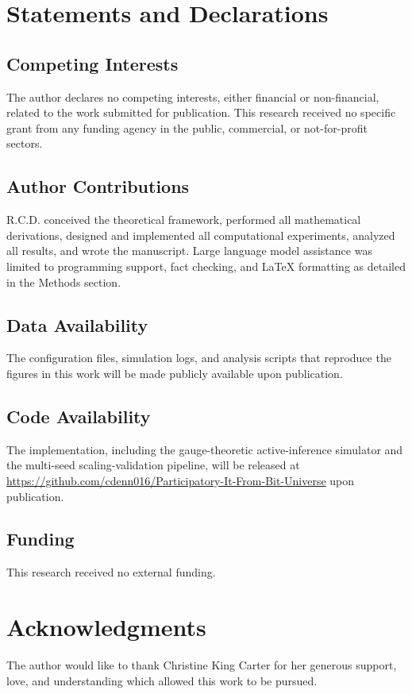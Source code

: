 \documentclass[11pt]{article}
\newenvironment{acknowledgments}
  {\section*{Acknowledgments}}
  {}
\begin{document}
\section*{Statements and Declarations}

\subsection*{Competing Interests}
The author declares no competing interests, either financial or non-financial, related to the work submitted for publication. This research received no specific grant from any funding agency in the public, commercial, or not-for-profit sectors.

\subsection*{Author Contributions}
R.C.D. conceived the theoretical framework, performed all mathematical derivations, designed and implemented all computational experiments, analyzed all results, and wrote the manuscript. Large language model assistance was limited to programming support, fact checking, and LaTeX formatting as detailed in the Methods section.

\subsection*{Data Availability}
The configuration files, simulation logs, and analysis scripts that reproduce the figures in this work will be made publicly available upon publication.

\subsection*{Code Availability}
The implementation, including the gauge-theoretic active-inference simulator and the multi-seed scaling-validation pipeline, will be released at \url{https://github.com/cdenn016/Participatory-It-From-Bit-Universe} upon publication.

\subsection*{Funding}
This research received no external funding.

\begin{acknowledgments}
The author would like to thank Christine King Carter for her generous support, love, and understanding which allowed this work to be pursued.
\end{acknowledgments}
\end{document}

